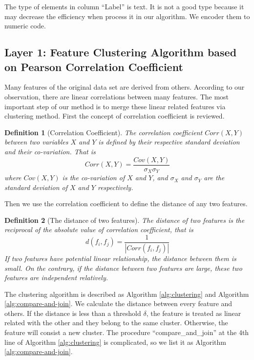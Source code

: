 \documentclass[journal]{IEEEtran}
\newtheorem{definition}{Definition}
\begin{document}
The type of elements in column ``Label'' is text. It is not a good type because it may decrease the efficiency when process it in our algorithm. We encoder them to numeric code.

\subsection{Layer 1: Feature Clustering Algorithm based on Pearson Correlation Coefficient}

Many features of the original data set are derived from others. According to our observation, there are linear correlations between many features. The most important step of our method is to merge these linear related features via clustering method. First the concept of correlation coefficient is reviewed.

\begin{definition}[Correlation Coefficient]
The correlation coefficient $Corr(X, Y)$ between two variables $X$ and $Y$ is defined by their respective standard deviation and their co-variation. That is
\begin{equation}
    Corr(X, Y) = \frac{Cov(X, Y)}{\sigma_X \sigma_Y}
\end{equation}
where $Cov(X, Y)$ is the co-variation of $X$ and $Y$, and $\sigma_X$ and $\sigma_Y$ are the standard deviation of $X$ and $Y$ respectively.
\end{definition}

Then we use the correlation coefficient to define the distance of any two features.

\begin{definition}[The distance of two features]
\label{def:distance}
The distance of two features is the reciprocal of the absolute value of correlation coefficient, that is
\begin{equation}
    d(f_i, f_j) = \frac{1}{|Corr(f_i, f_j)|}
\end{equation}
If two features have potential linear relationship, the distance between them is small. On the contrary, if the distance between two features are large, these two features are independent relatively.
\end{definition}

The clustering algorithm is described as Algorithm \ref{alg:clustering} and Algorithm \ref{alg:compare-and-join}. We calculate the distance between every feature and others. If the distance is less than a threshold $\delta$, the feature is treated as linear related with the other and they belong to the same cluster. Otherwise, the feature will consist a new cluster. The procedure ``compare\_and\_join'' at the 4th line of Algorithm \ref{alg:clustering} is complicated, so we list it as Algorithm \ref{alg:compare-and-join}.
\end{document}
